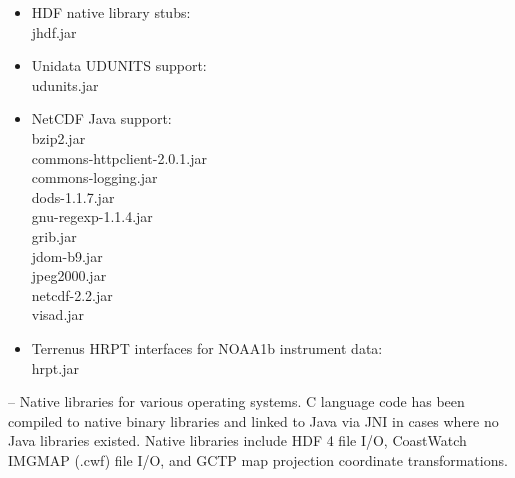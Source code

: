{\begin{description}
\begin{itemize}
\item HDF native library stubs:\\
{\file jhdf.jar}

\item Unidata UDUNITS support:\\
{\file udunits.jar}

\item NetCDF Java support:\\
{\file bzip2.jar}\\
{\file commons-httpclient-2.0.1.jar}\\
{\file commons-logging.jar}\\
{\file dods-1.1.7.jar}\\
{\file gnu-regexp-1.1.4.jar}\\
{\file grib.jar}\\
{\file jdom-b9.jar}\\
{\file jpeg2000.jar}\\
{\file netcdf-2.2.jar}\\
{\file visad.jar}

\item Terrenus HRPT interfaces for NOAA1b instrument data:\\
{\file hrpt.jar}

\end{itemize}

\item[{\file lib/aix},{\file linux},{\file macosx},{\file solaris},{\file
win32}/] -- Native libraries for various operating systems.  C
language code has been compiled to native binary libraries and
linked to Java via JNI in cases where no Java libraries existed.
Native libraries include HDF 4 file I/O, CoastWatch IMGMAP (.cwf)
file I/O, and GCTP map projection coordinate transformations.

\end{description}

}
